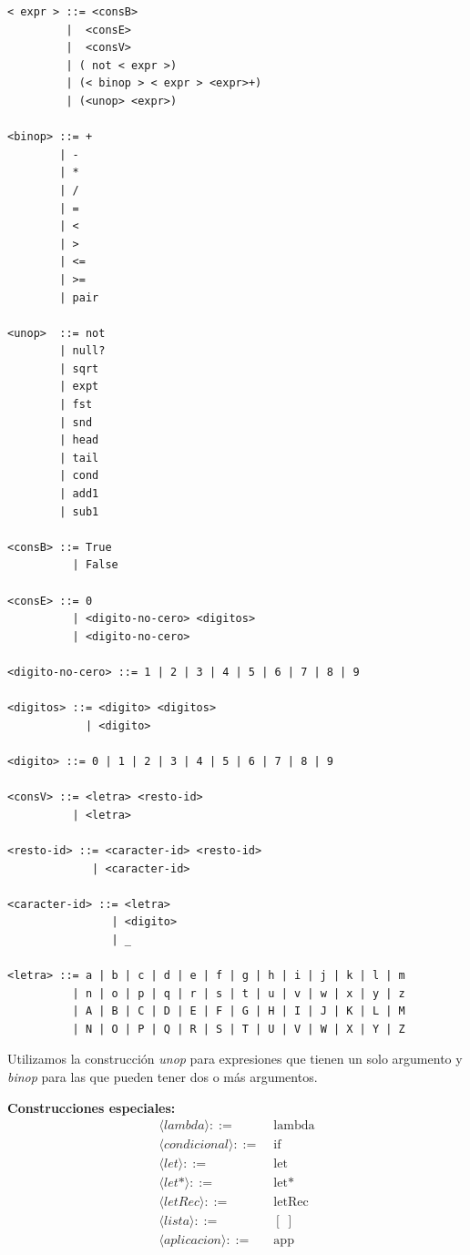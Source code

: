 \documentclass[a4paper,12pt]{article}
\begin{document}
\newpage
\begin{tcolorbox}[title= Correción: GLC de LAMBDAE     MÓDULO A2, breakable]

\begin{center}

\begin{verbatim}
< expr > ::= <consB>
         |  <consE>
         |  <consV>
         | ( not < expr >)
         | (< binop > < expr > <expr>+)
         | (<unop> <expr>)
       
<binop> ::= +
        | -
        | *
        | /
        | =
        | <
        | >
        | <=
        | >=
        | pair

<unop>  ::= not
        | null?
        | sqrt
        | expt
        | fst
        | snd
        | head
        | tail
        | cond
        | add1
        | sub1  

<consB> ::= True
          | False

<consE> ::= 0
          | <digito-no-cero> <digitos>
          | <digito-no-cero>

<digito-no-cero> ::= 1 | 2 | 3 | 4 | 5 | 6 | 7 | 8 | 9

<digitos> ::= <digito> <digitos>
            | <digito>

<digito> ::= 0 | 1 | 2 | 3 | 4 | 5 | 6 | 7 | 8 | 9

<consV> ::= <letra> <resto-id>
          | <letra>

<resto-id> ::= <caracter-id> <resto-id>
             | <caracter-id>

<caracter-id> ::= <letra>
                | <digito>
                | _

<letra> ::= a | b | c | d | e | f | g | h | i | j | k | l | m 
          | n | o | p | q | r | s | t | u | v | w | x | y | z
          | A | B | C | D | E | F | G | H | I | J | K | L | M
          | N | O | P | Q | R | S | T | U | V | W | X | Y | Z

\end{verbatim}
\end{center}  
Utilizamos la construcción \textit{unop} 
para expresiones que tienen un solo argumento y \textit{binop} para las que pueden tener dos o más argumentos.

\textbf{Construcciones especiales:}
\begin{align*}
\langle lambda \rangle ::= & \; \text{lambda} \\
\langle condicional \rangle ::= & \; \text{if} \\
\langle let \rangle ::= & \; \text{let} \\
\langle let* \rangle ::= & \; \text{let*} \\
\langle letRec \rangle ::= & \; \text{letRec} \\
\langle lista \rangle ::= & \; [ \; ] \\
\langle aplicacion \rangle ::= & \; \text{app}
\end{align*}

\end{tcolorbox}
\end{document}
